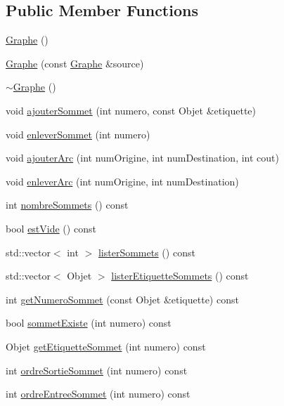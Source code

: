 \subsection*{Public Member Functions}
\begin{DoxyCompactItemize}
\item 
\hyperlink{class_graphe_adb8383352920cc36b73929998c90db53}{Graphe} ()
\item 
\hyperlink{class_graphe_ab92769924f1e76dd5e3872c1e85b229c}{Graphe} (const \hyperlink{class_graphe}{Graphe} \&source)
\item 
\hyperlink{class_graphe_af33551f1cd40e11d7a1983628d3d5641}{$\sim$Graphe} ()
\item 
void \hyperlink{class_graphe_a398d9e6777b28dd6a5ee1572f5128498}{ajouterSommet} (int numero, const Objet \&etiquette)
\item 
void \hyperlink{class_graphe_a70470e6b8b0ea59097c1a9a96e631f45}{enleverSommet} (int numero)
\item 
void \hyperlink{class_graphe_a3324e98fb20348bff3ffec78675b0ce5}{ajouterArc} (int numOrigine, int numDestination, int cout)
\item 
void \hyperlink{class_graphe_aa97c99653199bf922b44e07de8be0a99}{enleverArc} (int numOrigine, int numDestination)
\item 
int \hyperlink{class_graphe_a822c112c79faa409d2eeb95a9c2c4e7c}{nombreSommets} () const 
\item 
bool \hyperlink{class_graphe_afd8eb5bce922c62b2d5814dd95decf3e}{estVide} () const 
\item 
std::vector$<$ int $>$ \hyperlink{class_graphe_aedac4305a983b11ea0420ba80343635e}{listerSommets} () const 
\item 
std::vector$<$ Objet $>$ \hyperlink{class_graphe_a998f2dd61188d540e7789b6ea631e548}{listerEtiquetteSommets} () const 
\item 
int \hyperlink{class_graphe_a0de2ca6fa1f02d95fde97306217d2031}{getNumeroSommet} (const Objet \&etiquette) const 
\item 
bool \hyperlink{class_graphe_af9a087a2a780133f651af51fb25de677}{sommetExiste} (int numero) const 
\item 
Objet \hyperlink{class_graphe_af6efac3e9c660c4aacfa05c6bcba7ddf}{getEtiquetteSommet} (int numero) const 
\item 
int \hyperlink{class_graphe_a48e32c28c0845c0e112a3a3ae7bdb882}{ordreSortieSommet} (int numero) const 
\item 
int \hyperlink{class_graphe_a1123929cab8c05d7fc3f7a4317e88edb}{ordreEntreeSommet} (int numero) const 

\end{DoxyCompactItemize}

